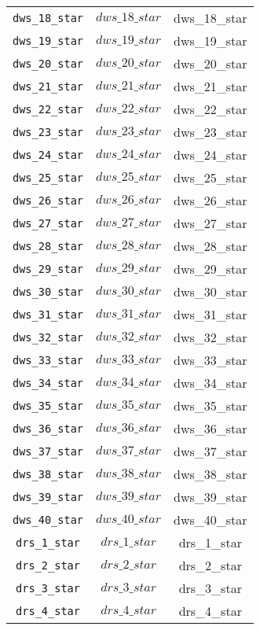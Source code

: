 \begin{center}
\begin{longtable}{ccc}
\texttt{dws\_18\_star} & $dws\_18\_star$ & dws\_18\_star\\
\texttt{dws\_19\_star} & $dws\_19\_star$ & dws\_19\_star\\
\texttt{dws\_20\_star} & $dws\_20\_star$ & dws\_20\_star\\
\texttt{dws\_21\_star} & $dws\_21\_star$ & dws\_21\_star\\
\texttt{dws\_22\_star} & $dws\_22\_star$ & dws\_22\_star\\
\texttt{dws\_23\_star} & $dws\_23\_star$ & dws\_23\_star\\
\texttt{dws\_24\_star} & $dws\_24\_star$ & dws\_24\_star\\
\texttt{dws\_25\_star} & $dws\_25\_star$ & dws\_25\_star\\
\texttt{dws\_26\_star} & $dws\_26\_star$ & dws\_26\_star\\
\texttt{dws\_27\_star} & $dws\_27\_star$ & dws\_27\_star\\
\texttt{dws\_28\_star} & $dws\_28\_star$ & dws\_28\_star\\
\texttt{dws\_29\_star} & $dws\_29\_star$ & dws\_29\_star\\
\texttt{dws\_30\_star} & $dws\_30\_star$ & dws\_30\_star\\
\texttt{dws\_31\_star} & $dws\_31\_star$ & dws\_31\_star\\
\texttt{dws\_32\_star} & $dws\_32\_star$ & dws\_32\_star\\
\texttt{dws\_33\_star} & $dws\_33\_star$ & dws\_33\_star\\
\texttt{dws\_34\_star} & $dws\_34\_star$ & dws\_34\_star\\
\texttt{dws\_35\_star} & $dws\_35\_star$ & dws\_35\_star\\
\texttt{dws\_36\_star} & $dws\_36\_star$ & dws\_36\_star\\
\texttt{dws\_37\_star} & $dws\_37\_star$ & dws\_37\_star\\
\texttt{dws\_38\_star} & $dws\_38\_star$ & dws\_38\_star\\
\texttt{dws\_39\_star} & $dws\_39\_star$ & dws\_39\_star\\
\texttt{dws\_40\_star} & $dws\_40\_star$ & dws\_40\_star\\
\texttt{drs\_1\_star} & $drs\_1\_star$ & drs\_1\_star\\
\texttt{drs\_2\_star} & $drs\_2\_star$ & drs\_2\_star\\
\texttt{drs\_3\_star} & $drs\_3\_star$ & drs\_3\_star\\
\texttt{drs\_4\_star} & $drs\_4\_star$ & drs\_4\_star\\

\end{longtable}
\end{center}
